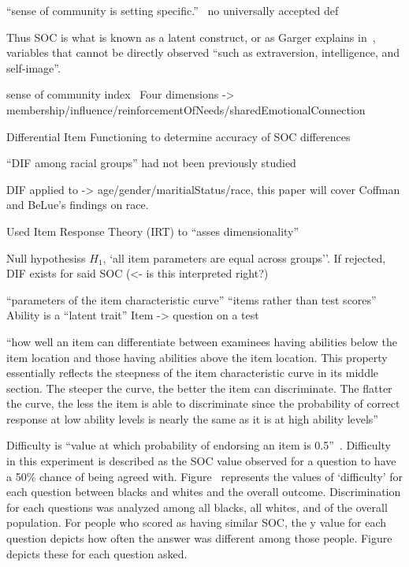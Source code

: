 \documentclass{sig-alternate}
\begin{document}





``sense of
community is setting specific.''~\cite{cognitiveLearning:2002}
no universally accepted def

Thus SOC is what is known as a latent construct, or as Garger explains in~\cite{latent:2011}, variables that cannot be directly observed ``such as extraversion, intelligence, and self-image''.

sense of community index~\cite{disparities:2009}
Four dimensions -> membership/influence/reinforcementOfNeeds/sharedEmotionalConnection

Differential Item Functioning to determine accuracy of SOC differences

``DIF among racial groups'' had not been previously studied

DIF applied to -> age/gender/maritialStatus/race, this paper will cover Coffman and BeLue's findings on race.

Used Item Response Theory (IRT) to ``asses dimensionality''

Null hypothesiss $H_1$, `all item parameters are equal across groups''. If rejected, DIF exists for said SOC (<- is this interpreted right?)


\cite{irt:2001}
``parameters of the item characteristic curve''
``items rather than test scores''
Ability is a ``latent trait''
Item -> question on a test


``how well an item can differentiate between
examinees having abilities below the item location and those having abilities
above the item location. This property essentially reflects the steepness of the
item characteristic curve in its middle section. The steeper the curve, the better
the item can discriminate. The flatter the curve, the less the item is able to
discriminate since the probability of correct response at low ability levels is
nearly the same as it is at high ability levels''

Difficulty is ``value at which probability of endorsing an item is 0.5''~\cite{disparities:2009}.
Difficulty in this experiment is described as the SOC value observed for a question to have a 50\% chance of being agreed with. Figure~%
represents the values of `difficulty' for each question between blacks and whites and the overall outcome.
Discrimination for each questions was analyzed among all blacks, all whites, and of the overall population. For people who scored as having similar SOC, the y value for each question depicts how often the answer was different among those people.
Figure~%
depicts these for each question asked. 
\end{document}
